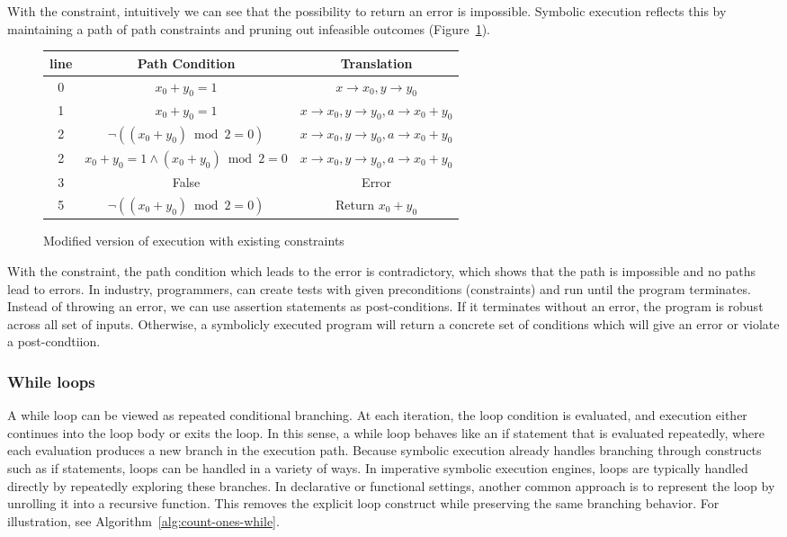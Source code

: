 \documentclass[11pt]{article}
\begin{document}
With the constraint, intuitively we can see that the possibility to return an error is impossible. Symbolic execution reflects this by maintaining a path of path constraints and pruning out infeasible outcomes (Figure~\ref{fig:symbolic-trace-with-constraint}).

\begin{figure}[H]
    \centering
    \begin{tabular}{|c|c|c|}
        \hline
        line & Path Condition & Translation \\
        \hline
        0 & $x_0+y_0=1$ & $x\to x_0, y\to y_0$ \\
        1 & $x_0+y_0=1$ & $x\to x_0, y\to y_0, a\to x_0+y_0$ \\
        2 & $\neg((x_0 + y_0) \bmod 2 = 0)$ & $x\to x_0, y\to y_0, a\to x_0+y_0$ \\
        2 &  $x_0+y_0=1 \land (x_0 + y_0) \bmod 2 = 0$ & $x\to x_0, y\to y_0, a\to x_0+y_0$ \\
        3 & False & Error \\
        5 & $\neg((x_0 + y_0) \bmod 2 = 0)$ & Return $x_0 + y_0$ \\
        \hline
    \end{tabular}
    \caption{Modified version of execution with existing constraints}
    \label{fig:symbolic-trace-with-constraint}
\end{figure}

With the constraint, the path condition which leads to the error is contradictory, which shows that the path is impossible and no paths lead to errors. In industry, programmers, can create tests with given preconditions (constraints) and run until the program terminates. Instead of throwing an error, we can use assertion statements as post-conditions. If it terminates without an error, the program is robust across all set of inputs. Otherwise, a symbolicly executed program will return a concrete set of conditions which will give an error or violate a post-condtiion.

\subsubsection{While loops}

A while loop can be viewed as repeated conditional branching. At each iteration, the loop condition is evaluated, and execution either continues into the loop body or exits the loop. In this sense, a while loop behaves like an if statement that is evaluated repeatedly, where each evaluation produces a new branch in the execution path. Because symbolic execution already handles branching through constructs such as if statements, loops can be handled in a variety of ways. In imperative symbolic execution engines, loops are typically handled directly by repeatedly exploring these branches. In declarative or functional settings, another common approach is to represent the loop by unrolling it into a recursive function. This removes the explicit loop construct while preserving the same branching behavior. For illustration, see Algorithm~\ref{alg:count-ones-while}.
\end{document}
